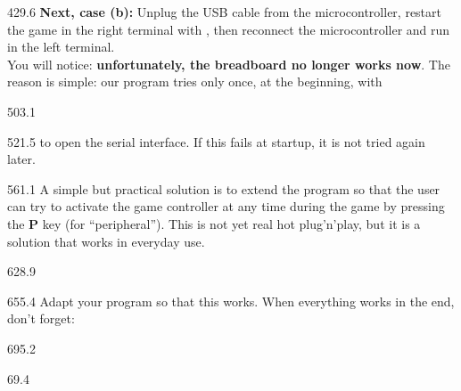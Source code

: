 \documentclass{aslab}
\begin{document}
\begin{region}[x=74.7,right=0,pitch=13.5]{429.6}
\textbf{Next, case (b):} Unplug the USB cable from the microcontroller,
restart the game in the right terminal with , then
reconnect the microcontroller and run  in the left
terminal.\\
You will notice: \textbf{unfortunately, the breadboard no longer works
now}. The reason is simple: our program tries only once, at the beginning,
with
\end{region}

\begin{region}[x=74.7,right=0]{503.1}
\end{region}

\begin{region}[x=74.7,right=0,pitch=13.2]{521.5}
to open the serial interface. If this fails at startup, it is not tried
again later.
\end{region}

\begin{region}[x=74.7,right=0,pitch=13.53]{561.1}
A simple but practical solution is to extend the program so that the user
can try to activate the game controller at any time during the game by
pressing the \textbf{P} key (for ``peripheral''). This is not yet real hot
plug'n'play, but it is a solution that works in everyday use.
\end{region}

\begin{region}[x=74.7,right=0]{628.9}
\end{region}

\begin{region}[x=74.7,right=0,pitch=13.2]{655.4}
Adapt your program so that this works. When everything works in the end,
don't forget:
\end{region}

\begin{region}[x=74.7,right=0,pitch=13.2]{695.2}
\\
\end{region}

\nextpage
\begin{region}{69.4}
\end{region}
\end{document}
